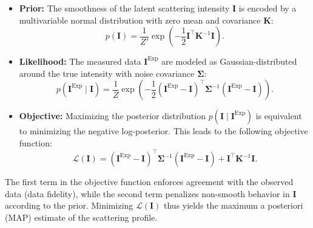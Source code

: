 \documentclass[12pt]{article}
\begin{document}
\begin{itemize}
    \item \textbf{Prior:} The smoothness of the latent scattering intensity \( \mathbf{I} \) is encoded by a multivariable normal distribution with zero mean and covariance \( \mathbf{K} \):
    \begin{equation}
        p(\mathbf{I}) = \frac{1}{Z'} \exp\left( -\frac{1}{2} \mathbf{I}^\top \mathbf{K}^{-1} \mathbf{I} \right).
    \end{equation}

    \item \textbf{Likelihood:} The measured data \( \mathbf{I}^{\mathrm{Exp}} \) are modeled as Gaussian-distributed around the true intensity with noise covariance \( \boldsymbol{\Sigma} \):
    \begin{equation}
        p(\mathbf{I}^{\mathrm{Exp}} \mid \mathbf{I}) = \frac{1}{Z} \exp\left( -\frac{1}{2} (\mathbf{I}^{\mathrm{Exp}} - \mathbf{I})^\top \boldsymbol{\Sigma}^{-1} (\mathbf{I}^{\mathrm{Exp}} - \mathbf{I}) \right).
    \end{equation}

    \item \textbf{Objective:} Maximizing the posterior distribution \( p(\mathbf{I} \mid \mathbf{I}^{\mathrm{Exp}}) \) is equivalent to minimizing the negative log-posterior. This leads to the following objective function:
    \begin{equation}
        \mathcal{L}(\mathbf{I}) = (\mathbf{I}^{\mathrm{Exp}} - \mathbf{I})^\top \boldsymbol{\Sigma}^{-1} (\mathbf{I}^{\mathrm{Exp}} - \mathbf{I}) + \mathbf{I}^\top \mathbf{K}^{-1} \mathbf{I}.
    \end{equation}
\end{itemize}
The first term in the objective function enforces agreement with the observed data (data fidelity), while the second term penalizes non-smooth behavior in \( \mathbf{I} \) according to the prior. Minimizing \( \mathcal{L}(\mathbf{I}) \) thus yields the maximum a posteriori (MAP) estimate of the scattering profile.
\end{document}
